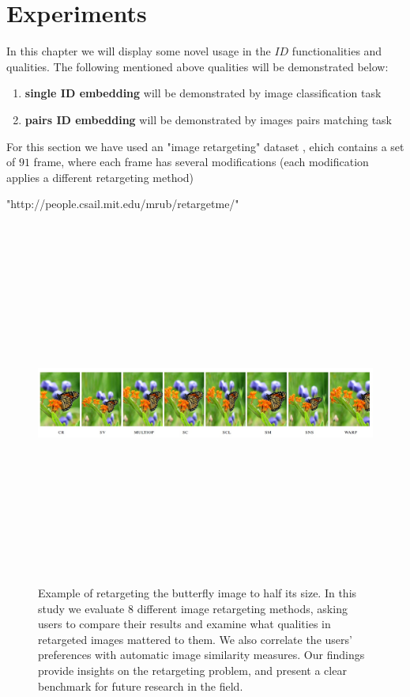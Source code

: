 
\chapter{Experiments} %

\label{Chapter8}

In this chapter we will display some novel usage in the $ID$ functionalities and qualities.
The following mentioned above qualities will be demonstrated below:

\begin{enumerate}
	\item \textbf{single ID embedding} will be demonstrated by image classification task
	\item \textbf{pairs ID embedding} will be demonstrated by images pairs matching task
\end{enumerate}

For this section we have used an "image retargeting" dataset \cite{ggg}, ehich contains a set of $91$ frame, where each frame has several modifications (each modification applies a different retargeting method)

"http://people.csail.mit.edu/mrub/retargetme/"

\begin{figure}[h] \label{rteregt}
	
	\includegraphics[width=\linewidth,height=12cm,keepaspectratio]{Figures/retargeting}
	\caption[image retargeting example]
	{Example of retargeting the butterfly image to half its size. In this study we evaluate 8 different image	retargeting methods, asking users to compare their results and examine what qualities in retargeted images mattered to them. We also correlate the users’ preferences with automatic image similarity measures. Our findings provide insights on the retargeting problem, and present a clear benchmark for future research in the field.}
	
\end{figure}


